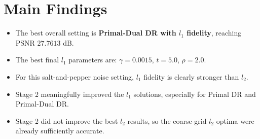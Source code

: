 \documentclass[11pt]{article}
\begin{document}
\section{Main Findings}
\begin{itemize}
\item The best overall setting is \textbf{Primal-Dual DR with $l_1$ fidelity}, reaching PSNR $27.7613$ dB.
\item The best final $l_1$ parameters are: $\gamma=0.0015$, $t=5.0$, $\rho=2.0$.
\item For this salt-and-pepper noise setting, $l_1$ fidelity is clearly stronger than $l_2$.
\item Stage 2 meaningfully improved the $l_1$ solutions, especially for Primal DR and Primal-Dual DR.
\item Stage 2 did not improve the best $l_2$ results, so the coarse-grid $l_2$ optima were already sufficiently accurate.
\end{itemize}
\end{document}
